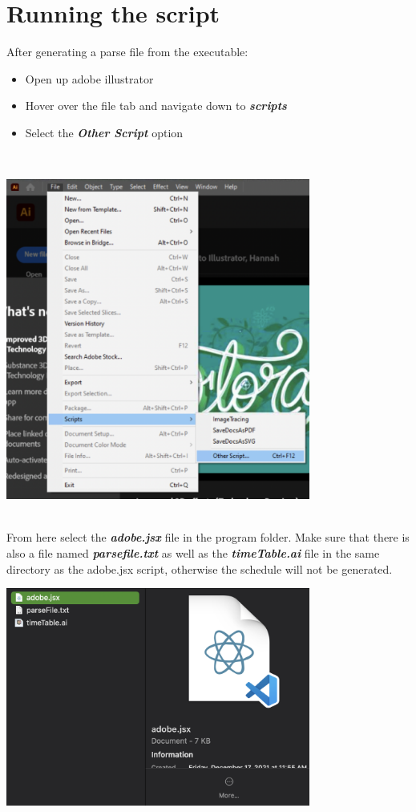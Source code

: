 \section*{Running the script}
After generating a parse file from the executable:
\begin{itemize}
    \item Open up adobe illustrator
    \item Hover over the file tab and navigate down to \textbf{\textit{scripts}}
    \item Select the \textbf{\textit{Other Script}} option
\end{itemize}
\\
\begin{center}
   \includegraphics[width=100mm]{images/adobe.png} 
\end{center}
\\
From here select the \textbf{\textit{adobe.jsx}} file in the program folder. Make sure that there is also a file named \textbf{\textit{parsefile.txt}} as well as the \textbf{\textit{timeTable.ai}} file in the same directory as the adobe.jsx script, otherwise the schedule will not be generated. 
\\
\begin{center}
   \includegraphics[width=100mm]{images/scriptFile.png} 
\end{center}
\\